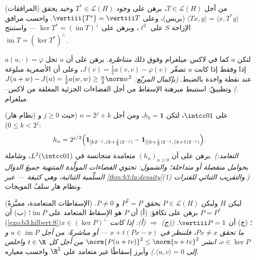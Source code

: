 \begin{exercise}[$\star\star$]\label{exo:b3:hilbert:8}
(المرافقات) من أجل $T \in \mathcal L(H)$، برهن على وجود $T^* \in \mathcal L(H)$ وحيد يحقق
$\langle Tx, y\rangle = \langle
x, T^*y\rangle$ (بريس)، وعلى $\vertiii{T^*} = \vertiii T$. واحسب مرافق الإزاحة $S$ على
$\ell^2$، وبرهن على $\ker T^* = (\operatorname{im}T)^\perp$ --- واستنتج $\overline{\operatorname{im}T} = (\ker T^*)^\perp$.
\end{exercise}

\begin{exercise}[$\star\star$]\label{exo:b3:hilbert:9}
لتكن $a$ كما في لاكس--ميلغرام وفوق ذلك \emph{متناظرة}. برهن على
أن $u$ تحل $a(u, \cdot) = \varphi$ إذا وفقط إذا كانت $u$ تصغّر $J(v) = \frac12a(v, v) - \varphi(v)$، وعلى أن
الأصغرية مبلوغة عند نقطة واحدة بالضبط. \emph{(بإكمال المربّع:
$J(u + w) - J(u) = \frac12a(w,w) \geq
\frac\alpha2\norm w^2$.)} وتطبيقٌ: استنبط مبرهنة الإسقاط من أجل الفضاءات
الجزئية المغلقة من لاكس--ميلغرام.
\end{exercise}

\begin{exercise}[$\star\star\star$]\label{exo:b3:hilbert:10}
(نظام هار) على $\intcc01$، لتكن $h_{0} = \mathbf 1$، ومن أجل
$n = 2^j + k$ (حيث $j \geq 0$ و $0 \leq k < 2^j$):
\[
h_n = 2^{j/2}\Bigl(\mathbf 1_{[k2^{-j},\,(k +
\frac12)2^{-j})} - \mathbf 1_{[(k+\frac12)2^{-j},\,(k+1)2^{-j})}
\Bigr).
\]
برهن على أن $(h_n)_{n\geq0}$ متعامدة متجانسة في
$L^2(\intcc01)$، وشاملة. \emph{(التعامد: بحوامل منفصلة أو
متداخلة؛ والشمول: تحتوي الفضاءات المولَّدة المنتهية جميعَ الدوال
السلّمية الثنائية، وهي كثيفة --- عبر \cref{thm:b3:lp:density}(1) والتقريب
الثنائي للفترات.)} ونظام هار سلفُ المويجات.
\end{exercise}

\begin{exercise}[$\star\star$]\label{exo:b3:hilbert:11}
(الإسقاطات المتعامدة، مميَّزةً) ليكن $H$  وليكن
$P \in \mathcal L(H)$ يحقق $P^2 = P$ و $P \neq 0$. برهن على تكافؤ:
(أ) أن $P$ هو الإسقاط المتعامد على $\operatorname{im}P$؛
(ب) أن $P = P^*$ (\cref{exo:b3:hilbert:8})؛
(ج) أن $\vertiii P = 1$.
\emph{((ج) $\Rightarrow$ (أ): إذا كانت $x \in
(\ker P)^\perp$ ما تحقق
$Px \neq x$، فلننظر في $x + t(Px - x)$ --- أو مباشرةً: من أجل
$u \in \operatorname{im}P$ و $v \in
\ker P$، انشر $\norm{P(u + tv)}^2 \leq \norm{u + tv}^2$ من أجل كل $t \in \R$ واخلص إلى
$\langle u, v\rangle = 0$.)}
وأبرز إسقاطًا غير متعامد على $\R^2$ واحسب معياره.
\end{exercise}

